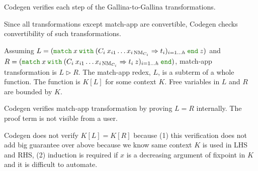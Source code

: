 \documentclass[a4paper,fleqn]{article}
\def\gallina{\textrm{Gallina}}
\def\codegen{\textrm{Codegen}}
\newcommand{\kwmatch}{\mbox{\color{mygreen}\ttfamily match}}
\newcommand{\kwwith}{\mbox{\color{mygreen}\ttfamily with}}
\newcommand{\kwend}{\mbox{\color{mygreen}\ttfamily end}}
\newcommand{\match}[4]{\kwmatch\:#1\:\kwwith\:(#2 \Rightarrow #3)_{#4}\:\kwend}
\DeclareMathOperator{\NM}{NM} %
\newcommand{\reltri}{\mathrel{\triangleright}}
\begin{document}
\codegen{} verifies each step of the \gallina-to-\gallina{} transformations.

Since all transformations except match-app are convertible,
\codegen{} checks convertibility of such transformations.

Assuming $L = (\match{x}{C_i\: x_{i1}\ldots x_{i\NM_{C_i}}}{t_i}{i=1\ldots h}\: z)$ and \\
$R = (\match{x}{C_i\: x_{i1}\ldots x_{i\NM_{C_i}}}{t_i\:z}{i=1\ldots h})$,
match-app transformation is $L \reltri R$.
The match-app redex, $L$, is a subterm of a whole function.
The function is $K[L]$ for some context $K$.
Free variables in $L$ and $R$ are bounded by $K$.

\codegen{} verifies match-app transformation by proving $L = R$ internally.
The proof term is not visible from a user.

\codegen{} does not verify $K[L] = K[R]$ because
(1) this verification does not add big guarantee over above because we know same context $K$ is used in LHS and RHS,
(2) induction is required if $x$ is a decreasing argument of fixpoint in $K$ and it is difficult to automate.



\end{document}
